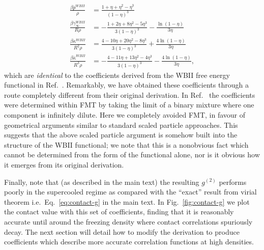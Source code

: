 \documentclass[11pt]{report}
\begin{document}
\begin{subequations}
  \begin{align}
    \frac{\beta p^{WBII}}{\rho} &=
    \frac{1 + \eta + \eta^2 - \eta^3}{(1-\eta)^3}
    \\
    \frac{\beta \gamma_\infty^{WBII}}{R\rho} &=
    -\frac{1 + 2\eta + 8\eta^2 - 5\eta^3}{3(1-\eta)^3}
    - \frac{\ln{(1-\eta)}}{3\eta}
    \\
    \frac{\beta \kappa^{WBII}}{R^2\rho} &=
    \frac{4 - 10\eta + 20\eta^2 - 8\eta^3}{3(1-\eta)^3} + \frac{4 \ln{(1-\eta)}}{3\eta}
    \\
    \frac{\beta \overline{\kappa}^{WBII}}{R^3\rho} &=
    - \frac{4 - 11\eta + 13\eta^2 - 4\eta^3}{3(1-\eta)^3} - \frac{4 \ln{(1-\eta)}}{3\eta},
  \end{align}
\end{subequations}
which are \emph{identical} to the coefficients derived from the WBII free energy functional in Ref.\ \cite{Hansen-Goos2006}.
Remarkably, we have obtained these coefficients through a route completely different from their original derivation.
In Ref.\ \cite{Hansen-Goos2006} the coefficients were determined within FMT by taking the limit of a binary mixture where one component is infinitely dilute.
Here we completely avoided FMT, in favour of geometrical arguments similar to standard scaled particle approaches.
This suggests that the above scaled particle argument is somehow built into the structure of the WBII functional; we note that this is a nonobvious fact which cannot be determined from the form of the functional alone, nor is it obvious how it emerges from its original derivation.

Finally, note that (as described in the main text) the resulting $g^{(2)}$ performs poorly in the supercooled regime as compared with the ``exact'' result from virial theorem i.e.\ Eq.\ \eqref{eq:contact-g} in the main text.
In Fig.\ \ref{fig:contact-g} we plot the contact value with this set of coefficients, finding that it is reasonably accurate until around the freezing density where contact correlations spuriously decay.
The next section will detail how to modify the derivation to produce coefficients which describe more accurate correlation functions at high densities.
\end{document}
